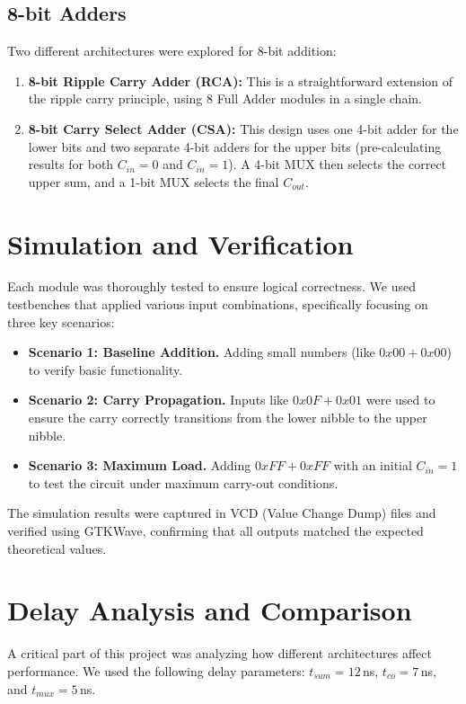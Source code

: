 \documentclass[a4paper,12pt]{article}
\begin{document}
\subsection{8-bit Adders}
Two different architectures were explored for 8-bit addition:
\begin{enumerate}
    \item \textbf{8-bit Ripple Carry Adder (RCA):} This is a straightforward extension of the ripple carry principle, using 8 Full Adder modules in a single chain.
    \item \textbf{8-bit Carry Select Adder (CSA):} This design uses one 4-bit adder for the lower bits and two separate 4-bit adders for the upper bits (pre-calculating results for both $C_{in}=0$ and $C_{in}=1$). A 4-bit MUX then selects the correct upper sum, and a 1-bit MUX selects the final $C_{out}$.
\end{enumerate}

\section{Simulation and Verification}
Each module was thoroughly tested to ensure logical correctness. We used testbenches that applied various input combinations, specifically focusing on three key scenarios:

\begin{itemize}
    \item \textbf{Scenario 1: Baseline Addition.} Adding small numbers (like $0x00 + 0x00$) to verify basic functionality.
    \item \textbf{Scenario 2: Carry Propagation.} Inputs like $0x0F + 0x01$ were used to ensure the carry correctly transitions from the lower nibble to the upper nibble.
    \item \textbf{Scenario 3: Maximum Load.} Adding $0xFF + 0xFF$ with an initial $C_{in}=1$ to test the circuit under maximum carry-out conditions.
\end{itemize}

The simulation results were captured in VCD (Value Change Dump) files and verified using GTKWave, confirming that all outputs matched the expected theoretical values.

\section{Delay Analysis and Comparison}

A critical part of this project was analyzing how different architectures affect performance. We used the following delay parameters: $t_{sum} = 12$\,ns, $t_{co} = 7$\,ns, and $t_{mux} = 5$\,ns.
\end{document}

